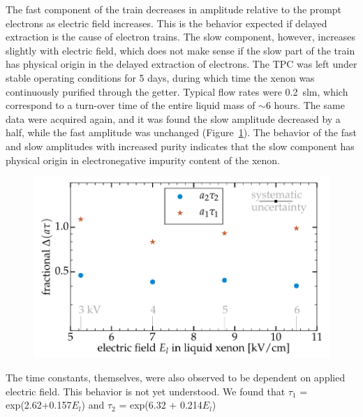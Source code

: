 The fast component of the train decreases in amplitude relative to the prompt electrons as electric field increases. This is the behavior expected if delayed extraction is the cause of electron trains. The slow component, however, increases slightly with electric field, which does not make sense if the slow part of the train has physical origin in the delayed extraction of electrons. The \ac{TPC} was left under stable operating conditions for 5 days, during which time the xenon was continuously purified through the getter. Typical flow rates were 0.2~slm, which correspond to a turn-over time of the entire liquid mass of $\sim$6 hours. The same data were acquired again, and it was found the slow amplitude decreased by a half, while the fast amplitude was unchanged (Figure~\ref{fig:etrain_result2}). The behavior of the fast and slow amplitudes with increased purity indicates that the slow component has physical origin in electronegative impurity content of the xenon.

\begin{figure}[htbp]
\begin{center}
\includegraphics[width=\textwidth]{figures/etrains/etrain_result2.png}
\caption{}
\label{fig:etrain_result2}
\end{center}
\end{figure}

The time constants, themselves, were also observed to be dependent on applied electric field. This behavior is not yet understood. We found that $\tau_{1}$ = exp(2.62+0.157$E_{l}$) and $\tau_{2}$ = exp(6.32 + 0.214$E_{l}$)

